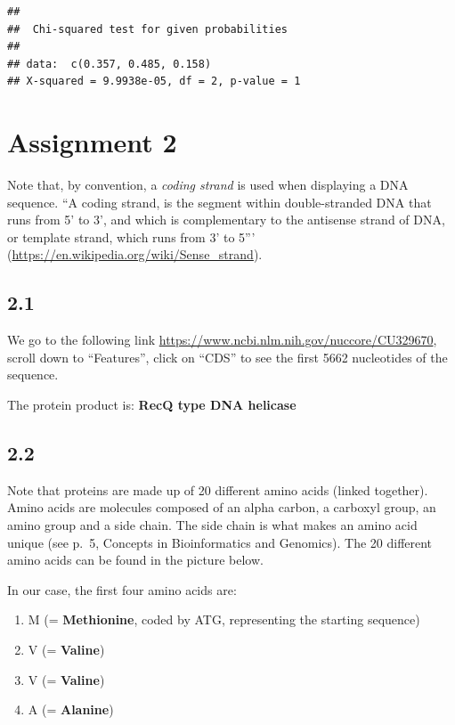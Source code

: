 \documentclass[]{article}
\providecommand{\tightlist}{%
  \setlength{\itemsep}{0pt}\setlength{\parskip}{0pt}}
\begin{document}
\begin{verbatim}
## 
##  Chi-squared test for given probabilities
## 
## data:  c(0.357, 0.485, 0.158)
## X-squared = 9.9938e-05, df = 2, p-value = 1
\end{verbatim}

\section{Assignment 2}\label{assignment-2}

Note that, by convention, a \emph{coding strand} is used when displaying
a DNA sequence. ``A coding strand, is the segment within double-stranded
DNA that runs from 5' to 3', and which is complementary to the antisense
strand of DNA, or template strand, which runs from 3' to 5'''
(\url{https://en.wikipedia.org/wiki/Sense_strand}).

\subsection{2.1}\label{section}

We go to the following link
\url{https://www.ncbi.nlm.nih.gov/nuccore/CU329670}, scroll down to
``Features'', click on ``CDS'' to see the first 5662 nucleotides of the
sequence.

The protein product is: \textbf{RecQ type DNA helicase}

\subsection{2.2}\label{section-1}

Note that proteins are made up of 20 different amino acids (linked
together). Amino acids are molecules composed of an alpha carbon, a
carboxyl group, an amino group and a side chain. The side chain is what
makes an amino acid unique (see p.~5, Concepts in Bioinformatics and
Genomics). The 20 different amino acids can be found in the picture
below.

In our case, the first four amino acids are:

\begin{enumerate}
\def\labelenumi{\arabic{enumi}.}
\tightlist
\item
  M (= \textbf{Methionine}, coded by ATG, representing the starting
  sequence)
\item
  V (= \textbf{Valine})
\item
  V (= \textbf{Valine})
\item
  A (= \textbf{Alanine})
\end{enumerate}
\end{document}
